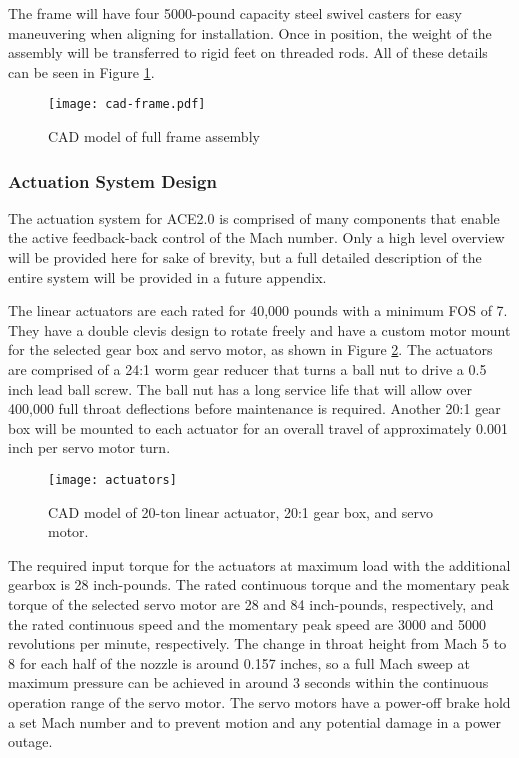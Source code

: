 The frame will have four 5000-pound capacity steel swivel casters for easy maneuvering when aligning for installation. Once in position, the weight of the assembly will be transferred to rigid feet on threaded rods. All of these details can be seen in Figure \ref{fig:cad-frame}.

\begin{figure}[ht!]
    \centering
    \texttt{[image: cad-frame.pdf]}
    \caption{CAD model of full frame assembly}
    \label{fig:cad-frame}
\end{figure}

\subsubsection*{Actuation System Design}

The actuation system for ACE2.0 is comprised of many components that enable the active  feedback-back control of the Mach number. Only a high level overview will be provided here for sake of brevity, but a full detailed description of the entire system will be provided in a future appendix.

The linear actuators are each rated for 40,000 pounds with a minimum FOS of 7. They have a double clevis design to rotate freely and have a custom motor mount for the selected gear box and servo motor, as shown in Figure \ref{fig:actuators}. The actuators are comprised of a 24:1 worm gear reducer that turns a ball nut to drive a 0.5 inch lead ball screw. The ball nut has a long service life that will allow over 400,000 full throat deflections before maintenance is required. Another 20:1 gear box will be mounted to each actuator for an overall travel of approximately 0.001 inch per servo motor turn.

\begin{figure}[ht]
    \centering
    \texttt{[image: actuators]}
    \caption{CAD model of 20-ton linear actuator, 20:1 gear box, and servo motor.}
    \label{fig:actuators}
\end{figure}

The required input torque for the actuators at maximum load with the additional gearbox is 28 inch-pounds. The rated continuous torque and the momentary peak torque of the selected servo motor are 28 and 84 inch-pounds, respectively, and the rated continuous speed and the momentary peak speed are 3000 and 5000 revolutions per minute, respectively. The change in throat height from Mach 5 to 8 for each half of the nozzle is around 0.157 inches, so a full Mach sweep at maximum pressure can be achieved in around 3 seconds within the continuous operation range of the servo motor. The servo motors have a power-off brake hold a set Mach number and to prevent motion and any potential damage in a power outage.

